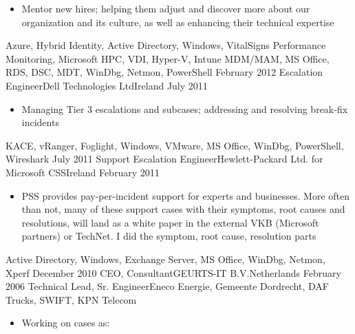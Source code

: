 \begin{experiences}
{\begin{itemize}
                        \item Mentor new hires; helping them adjust and discover more about our organization and its culture, as well as enhancing their technical expertise
                      \end{itemize}
                    }
                    {Azure, Hybrid Identity, Active Directory, Windows, VitalSigns Performance Monitoring, Microsoft HPC, VDI, Hyper-V, Intune MDM/MAM, MS Office, RDS, DSC, MDT, WinDbg, Netmon, PowerShell}
  \emptySeparator
  \experience
  {February 2012}   {Escalation Engineer}{Dell Technologies Ltd}{Ireland}
  {July 2011}       {
                      \begin{itemize}
                        \item Managing Tier 3 escalations and subcases; addressing and resolving break-fix incidents                                
                      \end{itemize}
                    }
                    {KACE, vRanger, Foglight, Windows, VMware, MS Office, WinDbg, PowerShell, Wireshark}
  \emptySeparator
  \experience
  {July 2011}       {Support Escalation Engineer}{Hewlett-Packard Ltd. for Microsoft CSS}{Ireland}
  {February 2011}   {                    
                      \begin{itemize}
                        \item PSS provides pay-per-incident support for experts and businesses. More often than not, many of these support cases with their symptoms, root causes and resolutions, will land as a white paper in the external VKB (Microsoft partners) or TechNet. I did the symptom, root cause, resolution parts                                        
                      \end{itemize}
                    }
                    {Active Directory, Windows, Exchange Server, MS Office, WinDbg, Netmon, Xperf}
  \emptySeparator   
  \consultantexperience
  {December 2010}   {CEO, Consultant}{GEURTS-IT B.V.}{Netherlands}
  {February 2006}   {Technical Lead, Sr. Engineer}{Eneco Energie, Gemeente Dordrecht, DAF Trucks, SWIFT, KPN Telecom}
                    {
                      \begin{itemize}
                        \item Working on cases as:
                        

\end{itemize}}
\end{experiences}
